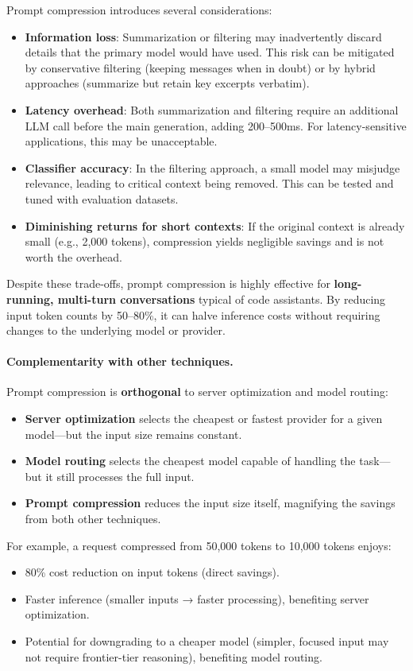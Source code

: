 \documentclass[english]{article}
\begin{document}
Prompt compression introduces several considerations:
\begin{itemize}
    \item \textbf{Information loss}: Summarization or filtering may inadvertently discard details that the primary model would have used. This risk can be mitigated by conservative filtering (keeping messages when in doubt) or by hybrid approaches (summarize but retain key excerpts verbatim).
    \item \textbf{Latency overhead}: Both summarization and filtering require an additional LLM call before the main generation, adding 200--500ms. For latency-sensitive applications, this may be unacceptable.
    \item \textbf{Classifier accuracy}: In the filtering approach, a small model may misjudge relevance, leading to critical context being removed. This can be tested and tuned with evaluation datasets.
    \item \textbf{Diminishing returns for short contexts}: If the original context is already small (e.g., 2,000 tokens), compression yields negligible savings and is not worth the overhead.
\end{itemize}

Despite these trade-offs, prompt compression is highly effective for \textbf{long-running, multi-turn conversations} typical of code assistants. By reducing input token counts by 50--80\%, it can halve inference costs without requiring changes to the underlying model or provider.

\paragraph{Complementarity with other techniques.}

Prompt compression is \textbf{orthogonal} to server optimization and model routing:
\begin{itemize}
    \item \textbf{Server optimization} selects the cheapest or fastest provider for a given model—but the input size remains constant.
    \item \textbf{Model routing} selects the cheapest model capable of handling the task—but it still processes the full input.
    \item \textbf{Prompt compression} reduces the input size itself, magnifying the savings from both other techniques.
\end{itemize}

For example, a request compressed from 50,000 tokens to 10,000 tokens enjoys:
\begin{itemize}
    \item 80\% cost reduction on input tokens (direct savings).
    \item Faster inference (smaller inputs → faster processing), benefiting server optimization.
    \item Potential for downgrading to a cheaper model (simpler, focused input may not require frontier-tier reasoning), benefiting model routing.
\end{itemize}
\end{document}

